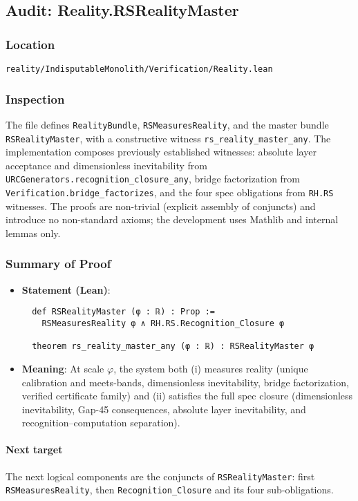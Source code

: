 \documentclass{article}
\newcommand{\FileRef}[1]{\texttt{#1}}
\begin{document}
\subsection{Audit: Reality.RSRealityMaster}
\subsubsection{Location}
\FileRef{reality/IndisputableMonolith/Verification/Reality.lean}

\subsubsection{Inspection}
The file defines \texttt{RealityBundle}, \texttt{RSMeasuresReality}, and the master bundle \texttt{RSRealityMaster}, with a constructive witness \texttt{rs\_reality\_master\_any}. The implementation composes previously established witnesses:
absolute layer acceptance and dimensionless inevitability from \texttt{URCGenerators.recognition\_closure\_any}, bridge factorization from \texttt{Verification.bridge\_factorizes}, and the four spec obligations from \texttt{RH.RS} witnesses. The proofs are non-trivial (explicit assembly of conjuncts) and introduce no non-standard axioms; the development uses Mathlib and internal lemmas only.

\subsubsection{Summary of Proof}
\begin{itemize}[leftmargin=*]
  \item \textbf{Statement (Lean)}:
  \begin{lstlisting}
  def RSRealityMaster (φ : ℝ) : Prop :=
    RSMeasuresReality φ ∧ RH.RS.Recognition_Closure φ

  theorem rs_reality_master_any (φ : ℝ) : RSRealityMaster φ
  \end{lstlisting}
  \item \textbf{Meaning}: At scale \(\varphi\), the system both (i) measures reality (unique calibration and meets-bands, dimensionless inevitability, bridge factorization, verified certificate family) and (ii) satisfies the full spec closure (dimensionless inevitability, Gap-45 consequences, absolute layer inevitability, and recognition–computation separation).
\end{itemize}

\paragraph{Next target} The next logical components are the conjuncts of \texttt{RSRealityMaster}: first \texttt{RSMeasuresReality}, then \texttt{Recognition\_Closure} and its four sub-obligations.
\end{document}
